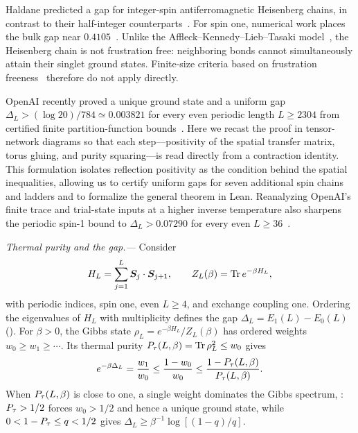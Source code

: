 Haldane predicted a gap for integer-spin antiferromagnetic Heisenberg
chains, in contrast to their half-integer counterparts~\cite{Haldane1983Continuum,Haldane1983Nonlinear}.
For spin one, numerical work places the bulk gap near
$0.4105$~\cite{White1993Numerical}. Unlike the
Affleck--Kennedy--Lieb--Tasaki model~\cite{Affleck1987Rigorous}, the
Heisenberg chain is not frustration free: neighboring bonds cannot
simultaneously attain their singlet ground states. Finite-size criteria
based on frustration freeness~\cite{Knabe1988Energy,Gosset2016Local}
therefore do not apply directly.

OpenAI recently proved a unique ground state and a uniform gap
$\Delta_L>(\log20)/784\simeq0.003821$ for every even periodic length
$L\ge2304$ from certified finite partition-function bounds~\cite{OpenAI2026Periodic}.
Here we recast the proof in tensor-network diagrams so that each
step—positivity of the spatial transfer matrix, torus gluing, and
purity squaring—is read directly from a contraction identity. This
formulation isolates reflection positivity as the condition behind
the spatial inequalities, allowing us to certify uniform gaps for
seven additional spin chains and ladders and to formalize the general
theorem in Lean. Reanalyzing OpenAI's finite trace and trial-state
inputs at a higher inverse temperature also sharpens the periodic
spin-1 bound to $\Delta_L>0.07290$ for every even $L\ge36$~\cite{SM}.

\emph{Thermal purity and the gap.---}
Consider
\begin{equation}
 H_L=\sum_{j=1}^{L}\bm S_j\cdot\bm S_{j+1},
 \qquad Z_L(\beta)=\operatorname{Tr} e^{-\beta H_L},
 \label{eq:core-model}
\end{equation}
with periodic indices, spin one, even $L\ge4$, and exchange coupling
one. Ordering the eigenvalues of $H_L$ with multiplicity defines the
gap $\Delta_L=E_1(L)-E_0(L)$ (\levels).
For $\beta>0$, the Gibbs state $\rho_L=e^{-\beta H_L}/Z_L(\beta)$
has ordered weights $w_0\ge w_1\ge\cdots$. Its thermal purity
$P_{\tau}(L,\beta)=\operatorname{Tr}\rho_L^2\le w_0$ gives
\begin{equation}
 e^{-\beta\Delta_L}=\frac{w_1}{w_0}
 \le\frac{1-w_0}{w_0}
 \le\frac{1-P_{\tau}(L,\beta)}{P_{\tau}(L,\beta)}.
 \label{eq:core-purity-gap}
\end{equation}
When $P_{\tau}(L,\beta)$ is close to one, a single weight dominates the
Gibbs spectrum, : $P_{\tau}>1/2$ forces $w_0>1/2$ and
hence a unique ground state, while $0<1-P_{\tau}\le q<1/2$ gives
$\Delta_L\ge\beta^{-1}\log[(1-q)/q]$.

